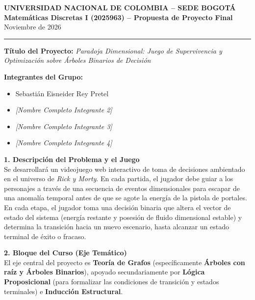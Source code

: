 \documentclass[11pt,letterpaper]{article}
\begin{document}
\begin{center}
    {\large \textbf{UNIVERSIDAD NACIONAL DE COLOMBIA -- SEDE BOGOTÁ}} \\
    \textbf{Matemáticas Discretas I (2025963) -- Propuesta de Proyecto Final} \\
    \small Noviembre de 2026
\end{center}

\hrule
\vspace{4pt}

\textbf{Título del Proyecto:} \textit{Paradoja Dimensional: Juego de Supervivencia y Optimización sobre Árboles Binarios de Decisión}

\textbf{Integrantes del Grupo:}
\begin{itemize}[noitemsep, topsep=1pt]
    \item Sebastián Eisneider Rey Pretel
    \item \textit{[Nombre Completo Integrante 2]}
    \item \textit{[Nombre Completo Integrante 3]}
    \item \textit{[Nombre Completo Integrante 4]}
\end{itemize}

\textbf{1. Descripción del Problema y el Juego} \\
Se desarrollará un videojuego web interactivo de toma de decisiones ambientado en el universo de \textit{Rick y Morty}. En cada partida, el jugador debe guiar a los personajes a través de una secuencia de eventos dimensionales para escapar de una anomalía temporal antes de que se agote la energía de la pistola de portales. En cada etapa, el jugador toma una decisión binaria que altera el vector de estado del sistema (energía restante y posesión de fluido dimensional estable) y determina la transición hacia un nuevo escenario, hasta alcanzar un estado terminal de éxito o fracaso.

\textbf{2. Bloque del Curso (Eje Temático)} \\
El eje central del proyecto es \textbf{Teoría de Grafos} (específicamente \textbf{Árboles con raíz y Árboles Binarios}), apoyado secundariamente por \textbf{Lógica Proposicional} (para formalizar las condiciones de transición y estados terminales) e \textbf{Inducción Estructural}.
\end{document}
